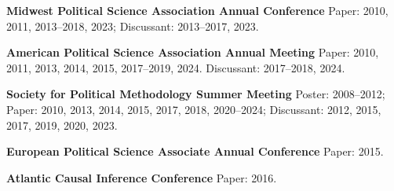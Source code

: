 \documentclass[11pt,article,oneside]{memoir}
\begin{document}
\begin{cvlist}[itemsep = 0em, parsep = 0em]
\item  {\bfseries Midwest Political Science Association Annual Conference} Paper: 2010, 2011, 2013--2018, 2023; Discussant: 2013--2017, 2023.
\item  {\bfseries American Political Science Association Annual Meeting} Paper: 2010, 2011, 2013, 2014, 2015, 2017--2019, 2024. Discussant: 2017--2018, 2024.
\item  {\bfseries Society for Political Methodology Summer Meeting} Poster: 2008--2012; Paper: 2010, 2013, 2014, 2015, 2017, 2018, 2020--2024; Discussant: 2012, 2015, 2017, 2019, 2020, 2023. 
\item  {\bfseries European Political Science Associate Annual Conference} Paper: 2015. 
\item  {\bfseries Atlantic Causal Inference Conference} Paper: 2016. 
\end{cvlist}
\bigskip
\end{document}
